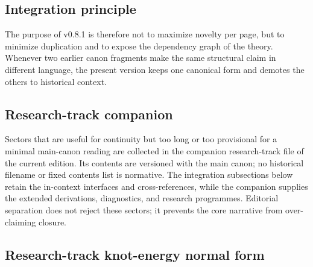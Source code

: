 \documentclass[11pt]{article}
\theoremstyle{definition}
\theoremstyle{plain}
\theoremstyle{remark}
\begin{document}
    \subsection{Integration principle}
        The purpose of v0.8.1 is therefore not to maximize novelty per page, but to minimize duplication and to expose the dependency graph of the theory. Whenever two earlier canon fragments make the same structural claim in different language, the present version keeps one canonical form and demotes the others to historical context.

    \subsection{Research-track companion}
        Sectors that are useful for continuity but too long or too provisional for a minimal main-canon reading are collected in the companion research-track file of the current edition.  Its contents are versioned with the main canon; no historical filename or fixed contents list is normative.  The integration subsections below retain the in-context interfaces and cross-references, while the companion supplies the extended derivations, diagnostics, and research programmes.  Editorial separation does not reject these sectors; it prevents the core narrative from over-claiming closure.

    \subsection{Research-track knot-energy normal form}
        \label{sec:research_track_knot_energy_normal_form}
\end{document}
